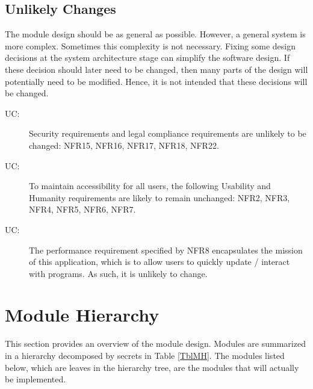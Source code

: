 \documentclass[12pt, titlepage]{article}
\newcounter{ucnum}
\newcommand{\uctheucnum}{UC\theucnum}
\begin{document}
\subsection{Unlikely Changes} \label{SecUchange}

The module design should be as general as possible. However, a general system is
more complex. Sometimes this complexity is not necessary. Fixing some design
decisions at the system architecture stage can simplify the software design. If
these decision should later need to be changed, then many parts of the design
will potentially need to be modified. Hence, it is not intended that these
decisions will be changed.

\begin{description}
\item[ \uctheucnum \label{ucLegal}:] Security requirements and legal compliance requirements are unlikely to be changed: NFR15, NFR16, NFR17, NFR18, NFR22.
\item[ \uctheucnum \label{ucUsability}:] To maintain accessibility for all users, the following Usability and Humanity requirements are likely to remain unchanged: NFR2, NFR3, NFR4, NFR5, NFR6, NFR7.
\item[ \uctheucnum \label{ucPerformance}:] The performance requirement specified by NFR8 encapsulates the mission of this application, which is to allow users to quickly update / interact with programs. As such, it is unlikely to change.
\end{description}

\section{Module Hierarchy} \label{SecMH}

This section provides an overview of the module design. Modules are summarized
in a hierarchy decomposed by secrets in Table \ref{TblMH}. The modules listed
below, which are leaves in the hierarchy tree, are the modules that will
actually be implemented.
\end{document}
